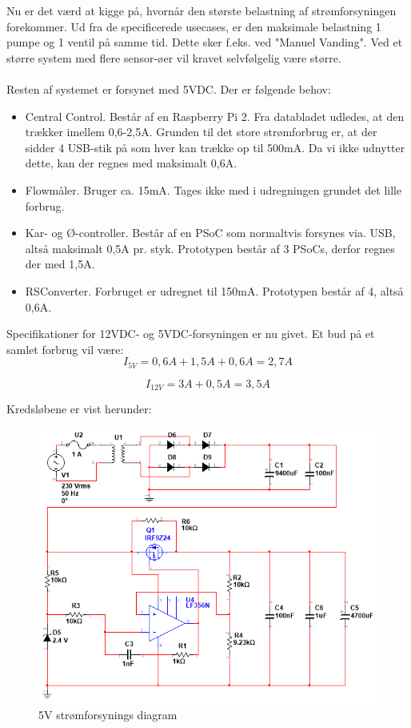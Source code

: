 Nu er det værd at kigge på, hvornår den største belastning af strømforsyningen forekommer. Ud fra de specificerede
usecases, er den maksimale belastning 1 pumpe og 1 ventil på samme tid. Dette sker f.eks. ved "Manuel Vanding". Ved et større system med flere
sensor-øer vil kravet selvfølgelig være større.
\\\\
Resten af systemet er forsynet med 5VDC. Der er følgende behov:
\begin{itemize}
\item Central Control. Består af en Raspberry Pi 2. Fra databladet udledes, at den trækker imellem 0,6-2,5A. Grunden til det store strømforbrug er,
at der sidder 4 USB-stik på som hver kan trække op til 500mA. Da vi ikke udnytter dette, kan der regnes med maksimalt 0,6A.
\item Flowmåler. Bruger ca. 15mA. Tages ikke med i udregningen grundet det lille forbrug.
\item Kar- og Ø-controller. Består af en PSoC som normaltvis forsynes via. USB, altså maksimalt 0,5A pr. styk. Prototypen består af 3 PSoCs, derfor regnes der med 1,5A.
\item RSConverter. Forbruget er udregnet til 150mA. Prototypen består af 4, altså 0,6A.
\end{itemize}

Specifikationer for 12VDC- og 5VDC-forsyningen er nu givet. Et bud på et samlet forbrug vil være:
\begin{equation}
	I_{5V} = 0,6A + 1,5A + 0,6A = 2,7A
\end{equation}

\begin{equation}
	I_{12V} = 3A + 0,5A = 3,5A
\end{equation}

Kredsløbene er vist herunder:
\begin{figure}[H]
	\centering
	\includegraphics[scale=0.75]{../Hardware/PSU/PSU_5V}
	\caption{5V strømforsynings diagram}
	\label{photo:PSU_5V}
\end{figure}

